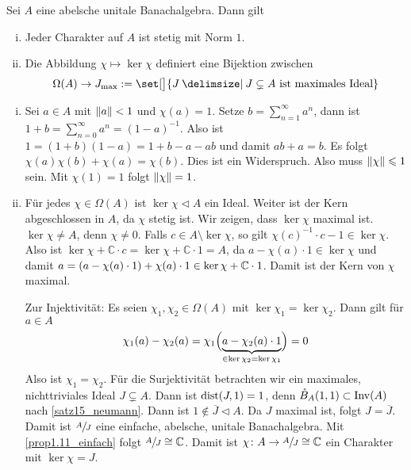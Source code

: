 \begin{satz}
	Sei $A$ eine abelsche unitale Banachalgebra. Dann gilt
	\begin{enumerate}[(i)]
		\item Jeder Charakter auf $A$ ist stetig mit Norm $1$.
		\item Die Abbildung $\chi \mapsto \ker \chi$ definiert eine Bijektion zwischen 
		\[
			\Omega(A) \to J_{\max} := \set[\big]{J \given J \subsetneq A \text{ ist maximales Ideal} }
		\]
	\end{enumerate}
\end{satz}
\begin{beweis}\leavevmode
	\begin{enumerate}[(i)]
		\item Sei $a \in A$ mit $\norm{a}<1$ und $\chi(a)=1$. Setze $b= \sum_{n=1}^{\infty} a^n$, dann ist $1 + b = \sum_{n=0}^{\infty} a^n = (1-a)^{-1}$. Also ist
		$1 = (1+b)(1-a) = 1 + b -a -ab$ und damit $ab+a=b$. Es folgt $\chi(a)\chi(b) + \chi(a)= \chi(b)$. Dies ist ein Widerspruch. Also muss $\norm{\chi}\le 1$ sein. Mit 
		$\chi(1)=1$ folgt $\norm{\chi}=1$.
		\item Für jedes $\chi \in \Omega(A)$ ist $\ker \chi \lhd A$ ein Ideal. Weiter ist der Kern abgeschlossen in $A$, da $\chi$ stetig ist. Wir zeigen, dass $\ker \chi$ maximal 
		ist. $\ker \chi \not= A$, denn $\chi \not= 0$. Falls $c \in A \setminus \ker \chi$, so gilt 
		\(
			\chi(c)^{-1} \cdot c-1 \in \ker \chi
		\).
		Also ist $\ker \chi + \mathds{C} \cdot c = \ker \chi + \mathds{C} \cdot 1=A$, da $a- \chi(a) \cdot 1 \in \ker \chi$ und damit 
		$a= \enbrace*{a- \chi(a) \cdot 1}+ \chi(a) \cdot 1 \in \ker \chi + \mathds{C} \cdot 1$. Damit ist der Kern von $\chi$ maximal.
		
		Zur Injektivität: Es seien $\chi_1, \chi_2 \in \Omega(A)$ mit $\ker \chi_1 = \ker \chi_2$. Dann gilt für $a \in A$
		\begin{align}
			\chi_1(a) - \chi_2(a) = \chi_1 \enbrace[\Big]{\Underbrace{a - \chi_2(a) \cdot 1}{\in \ker \chi_2=\ker \chi_1}} = 0
		\end{align}
		Also ist $\chi_1=\chi_2$. Für die Surjektivität betrachten wir ein maximales, nichttriviales Ideal $J \subsetneq A$. Dann ist $\dist \enbrace*{J,1}=1$, denn 
		$\mathring{B}_A(1,1) \subset \Inv(A)$ nach \autoref{satz15_neumann}. Dann ist $1 \notin \overline{J} \lhd A$. Da $J$ maximal ist, folgt $J=\overline{J}$. Damit ist 
		$\sfrac{A}{J}$ eine einfache, abelsche, unitale Banachalgebra. Mit \autoref{prop1.11_einfach} folgt $\sfrac{A}{J} \cong \mathds{C}$. Damit ist 
		$\chi \colon A \to \sfrac{A}{J} \cong \mathds{C}$ ein Charakter mit $\ker \chi= J$. \qedhere
	\end{enumerate}
\end{beweis}






\cleardoubleoddemptypage
{}
\setcounter{page}{1}

\printindex
\listoffigures
\todototoc
{}
